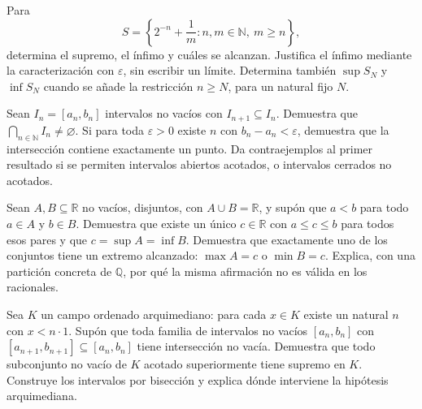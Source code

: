 \begin{samepage}
\begin{problem}\label{prob:reto-extremos-10}
Para
\[
S=\left\{2^{-n}+\frac1m:n,m\in\mathbb N,\ m\ge n\right\},
\]
determina el supremo, el ínfimo y cuáles se alcanzan. Justifica el ínfimo mediante la caracterización con $\varepsilon$, sin escribir un límite. Determina también $\sup S_N$ y $\inf S_N$ cuando se añade la restricción $n\ge N$, para un natural fijo $N$.~\cite{mseDobleConjunto}
\end{problem}
\end{samepage}
\par{}

\begin{samepage}
\begin{problem}\label{prob:reto-distribucion-01}
Sean $I_n=[a_n,b_n]$ intervalos no vacíos con $I_{n+1}\subseteq I_n$. Demuestra que $\bigcap_{n\in\mathbb N}I_n\ne\varnothing$. Si para toda $\varepsilon>0$ existe $n$ con $b_n-a_n<\varepsilon$, demuestra que la intersección contiene exactamente un punto. Da contraejemplos al primer resultado si se permiten intervalos abiertos acotados, o intervalos cerrados no acotados.~\cite{mseIntervalos}
\end{problem}
\end{samepage}
\par{}

\begin{samepage}
\begin{problem}\label{prob:reto-distribucion-02}
Sean $A,B\subseteq\mathbb R$ no vacíos, disjuntos, con $A\cup B=\mathbb R$, y supón que $a<b$ para todo $a\in A$ y $b\in B$. Demuestra que existe un único $c\in\mathbb R$ con $a\le c\le b$ para todos esos pares y que $c=\sup A=\inf B$. Demuestra que exactamente uno de los conjuntos tiene un extremo alcanzado: $\max A=c$ o $\min B=c$. Explica, con una partición concreta de $\mathbb Q$, por qué la misma afirmación no es válida en los racionales.
\end{problem}
\end{samepage}
\par{}

\begin{samepage}
\begin{problem}\label{prob:reto-distribucion-03}
Sea $K$ un campo ordenado arquimediano: para cada $x\in K$ existe un natural $n$ con $x<n\cdot1$. Supón que toda familia de intervalos no vacíos $[a_n,b_n]$ con $[a_{n+1},b_{n+1}]\subseteq[a_n,b_n]$ tiene intersección no vacía. Demuestra que todo subconjunto no vacío de $K$ acotado superiormente tiene supremo en $K$. Construye los intervalos por bisección y explica dónde interviene la hipótesis arquimediana.~\cite{mseIntervalosCompletitud}
\end{problem}
\end{samepage}
\par{}

